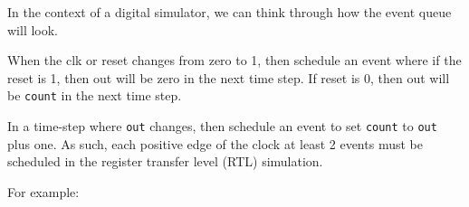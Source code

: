 \begin{Shaded}
\begin{Highlighting}[]
\OperatorTok{(}
               \OperatorTok{[}\OperatorTok{:}\OperatorTok{]}\OperatorTok{,}
               \OperatorTok{,}
               \OperatorTok{);}

   \OperatorTok{=} \OperatorTok{;}

\OperatorTok{[}\OperatorTok{:}\OperatorTok{]}\OperatorTok{;}
\OperatorTok{=}\OperatorTok{+} \OperatorTok{;}

 \OperatorTok{)} 
       \OperatorTok{(}\OperatorTok{)}
\OperatorTok{\textless{}=} \OperatorTok{;}
\OperatorTok{\textless{}=}\OperatorTok{;}

 
\end{Highlighting}
\end{Shaded}

In the context of a digital simulator, we can think through how the
event queue will look.

When the clk or reset changes from zero to 1, then schedule an event
where if the reset is 1, then out will be zero in the next time step. If
reset is 0, then out will be \texttt{count} in the next time step.

In a time-step where \texttt{out} changes, then schedule an event to set
\texttt{count} to \texttt{out} plus one. As such, each positive edge of
the clock at least 2 events must be scheduled in the register transfer
level (RTL) simulation.

For example:

